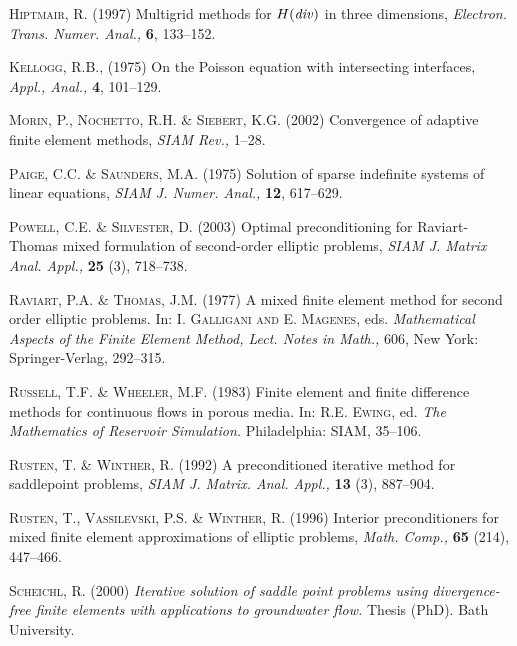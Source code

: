 \documentclass{imamci}
\numberwithin{equation}{section}
\begin{document}
\begin{references}
\item{}
\textsc{Hiptmair, R.} (1997)  {Multigrid methods for $H({\it div})$ in
three dimensions},  { \em Electron. Trans. Numer. Anal.,}  
\textbf{6}, 133--152.

\item{}
\textsc{Kellogg, R.B.,} (1975)  {On the Poisson equation with intersecting
interfaces},  {\em Appl., Anal.,}   \textbf{4}, 101--129.

\item{}
\textsc{Morin, P., Nochetto, R.H. \& Siebert, K.G.} (2002)  {Convergence
of adaptive finite element methods},  {\em SIAM Rev.,}  
1--28.

\item{}
\textsc{Paige, C.C. \& Saunders, M.A.} (1975)  {Solution of sparse
indefinite systems of linear equations,}  {\em SIAM J. Numer. Anal.,}
  \textbf{12}, 617--629.

\item{}
\textsc{Powell, C.E. \& Silvester, D.} (2003)  {Optimal preconditioning
for Raviart-Thomas mixed formulation of second-order elliptic problems,}
 {\em SIAM J. Matrix Anal. Appl.,} \textbf{25} (3), 718--738.

\item{}
\textsc{Raviart, P.A. \& Thomas, J.M.} (1977)  {A mixed finite element
method for second order elliptic problems.}  {In: \textsc{I. Galligani
and E. Magenes,} eds. \em Mathematical Aspects of the Finite Element Method,
Lect. Notes in Math.,} 606, New York: Springer-Verlag, 292--315.

\item{}
\textsc{Russell, T.F. \& Wheeler, M.F.} (1983)  {Finite element and
finite difference methods for continuous flows in porous media.}  {In:
\textsc{R.E. Ewing,} ed. \em  The Mathematics of Reservoir Simulation.} Philadelphia:
SIAM, 35--106.

\item{}
\textsc{Rusten, T. \& Winther, R.} (1992)  {A preconditioned iterative
method for saddlepoint problems},  {\em SIAM J. Matrix. Anal. Appl.,}
  \textbf{13} (3), 887--904.

\item{}
\textsc{Rusten, T., Vassilevski, P.S. \& Winther, R.} (1996)  {Interior
preconditioners for mixed finite element approximations of elliptic problems},
 {\em Math. Comp.,}   \textbf{65} (214), 447--466.

\item{}
\textsc{Scheichl, R.} (2000)  {\em Iterative solution of saddle point
problems using divergence-free finite elements with applications to groundwater
flow.} Thesis (PhD). Bath University.


\end{references}
\end{document}
